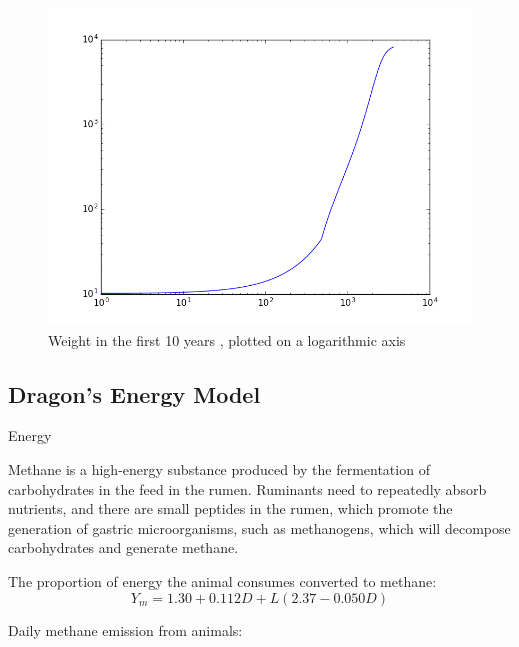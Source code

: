 \begin{figure}[htbp]
    \centering
    \includegraphics[width=.5\textwidth]{figures/attri/weight.png}
    \caption{Weight in the first 10 years , plotted on a logarithmic axis}
    \label{fig:weight}
\end{figure}

\subsection{Dragon's Energy Model}
    
\begin{defn}{Energy}
\end{defn}

Methane is a high-energy substance produced by the fermentation of carbohydrates in the feed in the rumen. Ruminants need to repeatedly absorb nutrients, and there are small peptides in the rumen, which promote the generation of gastric microorganisms, such as methanogens, which will decompose carbohydrates and generate methane.

The proportion of energy the animal consumes converted to methane: \cite{CH4proportion}
\begin{equation}\label{equ:甲烷转化率}
Y_m = 1.30+0.112D+L(2.37-0.050D)
\end{equation}

Daily methane emission from animals:


